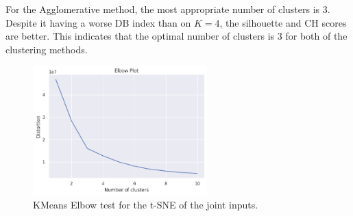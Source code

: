For the Agglomerative method, the most appropriate number of clusters is 3. Despite it having a worse DB index than on $K=4$, the silhouette and CH scores are better. This indicates that the optimal number of clusters is 3 for both of the clustering methods.

\begin{figure}[h]
    \caption{KMeans Elbow test for the t-SNE of the joint inputs.}
    \label{fig:tsne_joint_elbow}
    \centering
    \includegraphics[width=0.6\textwidth]{figures/tsne_joint_elbow_test.png}
\end{figure}

